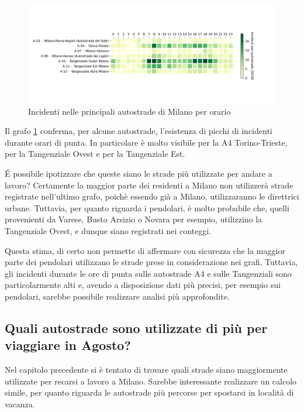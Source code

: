 \documentclass[a4paper,12pt]{report}
\begin{document}
\begin{figure}
    \includegraphics[width=\linewidth]{../src/incidenti/incidenti_aci/orari/tangenziali_autostrade.png}
    \caption{Incidenti nelle principali autostrade di Milano per orario}
    \label{fig:tangenziali-autostrade}
\end{figure}

Il grafo \ref{fig:tangenziali-autostrade} conferma, per alcune autostrade, 
l'esistenza di picchi di incidenti durante orari di punta. 
In particolare è molto visibile per la A4 Torino-Trieste, 
per la Tangenziale Ovest e per la Tangenziale Est.

\'E possibile ipotizzare che queste siano le strade più utilizzate per 
andare a lavoro? 
Certamente la maggior parte dei residenti a Milano non utilizzerà strade registrate 
nell'ultimo grafo, poichè essendo già a Milano, utilizzaranno le direttrici urbane. 
Tuttavia, per quanto riguarda i pendolari, è molto probabile che, quelli provenienti 
da Varese, Busto Arsizio o Novara per esempio, utilizzino la Tangenziale Ovest, 
e dunque siano registrati nei conteggi. 

Questa stima, di certo non permette di affermare con sicurezza 
che la maggior parte dei pendolari utilizzano le strade prese in considerazione 
nei grafi.
Tuttavia, gli incidenti durante le ore di punta sulle autostrade A4 e sulle 
Tangenziali sono particolarmente alti e, avendo a disposizione dati più 
precisi, per esempio sui pendolari, sarebbe possibile realizzare analisi 
più approfondite.

\subsection{Quali autostrade sono utilizzate di più per viaggiare in Agosto?}

Nel capitolo precedente si è tentato di trovare quali strade siano maggiormente 
utilizzate per recarsi a lavoro a Milano. 
Sarebbe interessante realizzare un calcolo simile, per quanto riguarda le autostrade 
più percorse per spostarsi in località di vacanza. 
\end{document}
